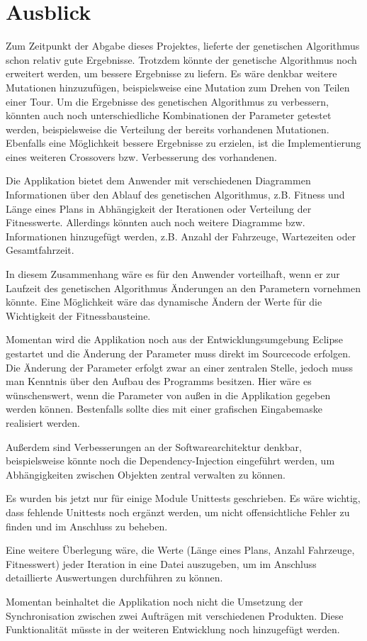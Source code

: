 \section{Ausblick}
Zum Zeitpunkt der Abgabe dieses Projektes, lieferte der genetischen Algorithmus schon relativ gute Ergebnisse. Trotzdem könnte der genetische Algorithmus noch erweitert werden, um bessere Ergebnisse zu liefern. Es wäre denkbar weitere Mutationen hinzuzufügen, beispielsweise eine Mutation zum Drehen von Teilen einer Tour. Um die Ergebnisse des genetischen Algorithmus zu verbessern, könnten auch noch unterschiedliche Kombinationen der Parameter getestet werden, beispielsweise die Verteilung der bereits vorhandenen Mutationen. Ebenfalls eine Möglichkeit bessere Ergebnisse zu erzielen, ist die Implementierung eines weiteren Crossovers bzw. Verbesserung des vorhandenen.

Die Applikation bietet dem Anwender mit verschiedenen Diagrammen Informationen über den Ablauf des genetischen Algorithmus, z.B. Fitness und Länge eines Plans in Abhängigkeit der Iterationen oder Verteilung der Fitnesswerte. Allerdings könnten auch noch weitere Diagramme bzw. Informationen hinzugefügt werden, z.B. Anzahl der Fahrzeuge, Wartezeiten oder Gesamtfahrzeit.

In diesem Zusammenhang wäre es für den Anwender vorteilhaft, wenn er zur Laufzeit des genetischen Algorithmus Änderungen an den Parametern vornehmen könnte. Eine Möglichkeit wäre das dynamische Ändern der Werte für die Wichtigkeit der Fitnessbausteine.

Momentan wird die Applikation noch aus der Entwicklungsumgebung Eclipse gestartet und die Änderung der Parameter muss direkt im Sourcecode erfolgen. Die Änderung der Parameter erfolgt zwar an einer zentralen Stelle, jedoch muss man Kenntnis über den Aufbau des Programms besitzen. Hier wäre es wünschenswert, wenn die Parameter von außen in die Applikation gegeben werden können. Bestenfalls sollte dies mit einer grafischen Eingabemaske realisiert werden.

Außerdem sind Verbesserungen an der Softwarearchitektur denkbar, beispielsweise könnte noch die Dependency-Injection eingeführt werden, um Abhängigkeiten zwischen Objekten zentral verwalten zu können.

Es wurden bis jetzt nur für einige Module Unittests geschrieben. Es wäre wichtig, dass fehlende Unittests noch ergänzt werden, um nicht offensichtliche Fehler zu finden und im Anschluss zu beheben.

Eine weitere Überlegung wäre, die Werte (Länge eines Plans, Anzahl Fahrzeuge, Fitnesswert) jeder Iteration in eine Datei auszugeben, um im Anschluss detaillierte Auswertungen durchführen zu können.

Momentan beinhaltet die Applikation noch nicht die Umsetzung der Synchronisation zwischen zwei Aufträgen mit verschiedenen Produkten. Diese Funktionalität müsste in der weiteren Entwicklung noch hinzugefügt werden.
